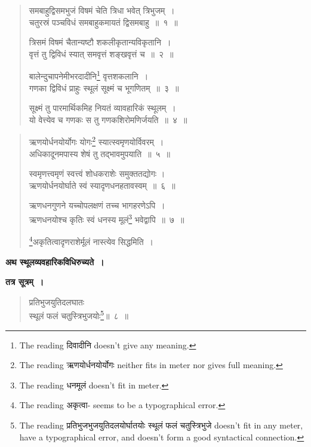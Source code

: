 \documentclass[11pt, openany]{book}
\begin{document}
\begin{quote}
    \bs 
    समबाहुद्विसमभुजं विषमं चेति त्रिधा भवेत् त्रिभुजम्~।\\
चतुरस्रं पञ्चविधं समबाहुकमायतं द्विसमबाहु~॥~१~॥ 
\vspace{1mm}

त्रिसमं विषमं चैतान्यष्टौ शकलीकृतान्यविकृतानि~।\\
वृत्तं तु द्विविधं स्यात् समवृत्तं शङ्खवृत्तं च~॥~२~॥
\vspace{1mm}

बालेन्दुचापनेमीभरदादीनि\footnote{The reading दिवादीनि doesn't give any meaning.} वृत्तशकलानि~। \\
गणका द्विविधं प्राहुः स्थूलं सूक्ष्मं च भूगणितम्~॥~३~॥
\vspace{1mm}

सूक्ष्मं तु पारमार्थिकमिह नियतं व्यावहारिकं स्थूलम्~।\\
यो वेत्त्येव च गणकः स तु गणकशिरोमणिर्जयति~॥~४~॥
\end{quote}
\newpage
\setcounter{footnote}{0}
\begin{quote}
    \bs 
ऋणयोर्धनयोर्योगः योगः\footnote{The reading ऋणयोर्धनयोर्योगः neither fits in meter nor gives full meaning.} स्यात्स्वमृणयोर्विवरम्~।\\
अधिकादूनमपास्य शेषं तु तद्भावमुपयाति~॥~५~॥
\vspace{1mm}

स्वमृणत्त्वमृणं स्वत्त्वं शोधकराशेः समुक्ततद्योगः । \\
ऋणयोर्धनयोर्घाते स्वं स्यादृणधनहतावस्वम्~॥~६~॥
\vspace{1mm}

 \label{4.7}
ऋणधनगुणने यच्चोपलक्षणं तच्च भागहरणेऽपि~। \\
ऋणधनयोश्च कृतिः स्वं धनस्य मूलं\footnote{The reading धनमूलं doesn't fit in meter.} भवेद्वापि~॥~७~॥
\vspace{1mm}

\footnote{The reading अकृत्वा- seems to be a typographical error.}अकृतित्वादृणराशेर्मूलं नास्त्येव सिद्धमिति~।
\end{quote}
\vspace{4mm}

\textbf{अथ स्थूलव्यवहारिकविधिरुच्यते~।} \\
\vspace{-2mm}

\textbf{तत्र सूत्रम्~। }

 \label{4.8}
\begin{quote}
    \bs 
प्रतिभुजयुतिदलघातः \\
स्थूलं फलं चतुस्त्रिभुजयोः\footnote{The reading प्रतिभुजभुजयुतिदलयोर्घातयोः स्थूलं फलं चतुस्त्रिभुजे doesn't fit in any meter, have a typographical error, and doesn't form a good syntactical connection.}॥~८~॥
\end{quote}
\end{document}

